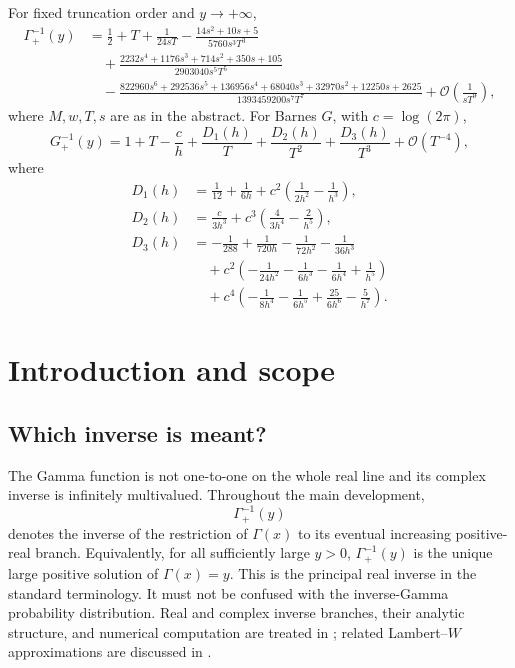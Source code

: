\documentclass[11pt]{article}
\theoremstyle{definition}
\theoremstyle{remark}
\newcommand{\BigO}{\mathcal O}
\newcommand{\Gaminv}{\Gamma_{+}^{-1}}
\newcommand{\Barinv}{G_{+}^{-1}}
\begin{document}
\begin{summarybox}
\small
For fixed truncation order and \(y\to+\infty\),
\begin{align*}
\Gaminv(y)
 &=\frac12+T+\frac{1}{24sT}
 -\frac{14s^{2}+10s+5}{5760s^{3}T^{3}}\\
 &\quad+\frac{2232s^{4}+1176s^{3}+714s^{2}+350s+105}
 {2903040s^{5}T^{5}}\\
 &\quad-\frac{822960s^{6}+292536s^{5}+136956s^{4}+68040s^{3}
 +32970s^{2}+12250s+2625}
 {1393459200s^{7}T^{7}}
 +\BigO\!\left(\frac{1}{sT^{9}}\right),
\end{align*}
where \(M,w,T,s\) are as in the abstract.  For Barnes \(G\), with
\(c=\log(2\pi)\),
\[
 \Barinv(y)=1+T-\frac{c}{h}+\frac{D_1(h)}{T}
 +\frac{D_2(h)}{T^2}+\frac{D_3(h)}{T^3}
 +\BigO(T^{-4}),
\]
where
\begin{align*}
D_1(h)&=\frac1{12}+\frac1{6h}+c^2\!\left(\frac1{2h^2}-\frac1{h^3}\right),\\
D_2(h)&=\frac{c}{3h^3}+c^3\!\left(\frac{4}{3h^4}-\frac{2}{h^5}\right),\\
D_3(h)&=-\frac1{288}+\frac1{720h}-\frac1{72h^2}-\frac1{36h^3}\\
&\quad+c^2\!\left(-\frac1{24h^2}-\frac1{6h^3}-\frac1{6h^4}+\frac1{h^5}\right)\\
&\quad+c^4\!\left(-\frac1{8h^4}-\frac1{6h^5}+\frac{25}{6h^6}-\frac5{h^7}\right).
\end{align*}
\end{summarybox}

\tableofcontents
\clearpage

\section{Introduction and scope}

\subsection{Which inverse is meant?}

The Gamma function is not one-to-one on the whole real line and its complex inverse is infinitely multivalued.  Throughout the main development,
\[
  \Gaminv(y)
\]
denotes the inverse of the restriction of \(\Gamma(x)\) to its eventual increasing positive-real branch.  Equivalently, for all sufficiently large \(y>0\), \(\Gaminv(y)\) is the unique large positive solution of \(\Gamma(x)=y\).  This is the principal real inverse in the standard terminology.  It must not be confused with the inverse-Gamma probability distribution.  Real and complex inverse branches, their analytic structure, and numerical computation are treated in \cite{Uchiyama,Pedersen,FolitseJeffreyCorless,JeffreyWatt}; related Lambert--\(W\) approximations are discussed in \cite{BorweinCorless}.
\end{document}
